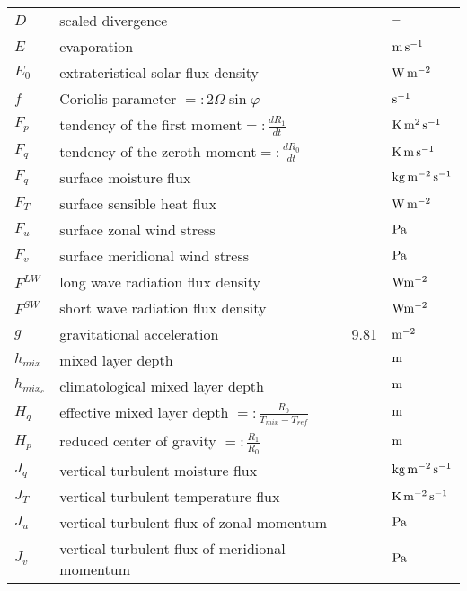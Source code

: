 \begin{tabular*}{\textwidth}{l@{\extracolsep\fill}lll}
$D$       & scaled divergence                          &         & $\rm -$ \\

$E$       & evaporation                      &         & $\rm m\,
s^{-1}$ \\
$E_0$          & extrateristical solar flux density         &         & $\rm W\,
m^{-2}$ \\

$f$       & Coriolis parameter $=:2\Omega\sin\varphi$  &         & $\rm
s^{-1}$ \\
$F_p$          & tendency of the first moment$=:\frac{d R_{1}}{d t}$  &    &
$\rm K\, m^2\, s^{-1}$ \\
$F_q$          & tendency of the zeroth moment$=:\frac{d R_{0}}{d t}$ &    &
$\rm K\, m\, s^{-1}$ \\
$F_q$          & surface moisture flux            &         & $\rm kg\,
m^{-2}\, s^{-1}$ \\
$F_T$          & surface sensible heat flux            &         & $\rm W\,
m^{-2}$ \\
$F_u$          & surface zonal wind stress             &         & $\rm Pa$
\\
$F_v$          & surface meridional wind stress        &         & $\rm Pa$
\\
$F^{LW}$  & long wave radiation flux density      &    &$\rm  W m^{-2}$ \\
$F^{SW}$  & short wave radiation flux density     &    &$\rm  W m^{-2}$ \\
$g$       & gravitational acceleration            & 9.81         & $\rm
m^{-2}$ \\

$h_{mix}$      & mixed layer depth                     &         & $\rm m$ \\
$h_{mix_c}$    & climatological mixed layer depth           &         & $\rm m$ \\
$H_q$          & effective mixed layer depth $=:\frac{R_{0}}{T_{mix}-T_{ref}}$ &
& $\rm m$ \\
$H_p$          & reduced center of gravity $=:\frac{R_{1}}{R_0}$ &         &
$\rm m$ \\ 

$J_q$          & vertical turbulent moisture flux           &         & $\rm kg\, m^{-2}\,
s^{-1}$ \\
$J_T$          & vertical turbulent temperature flux        &         & $\rm K\,
m^{-2}\, s^{-1}$ \\
$J_u$          & vertical turbulent flux of zonal momentum  &         & $\rm Pa$
\\
$J_v$          & vertical turbulent flux of meridional momentum &          & $\rm Pa$
\\


\end{tabular*}
